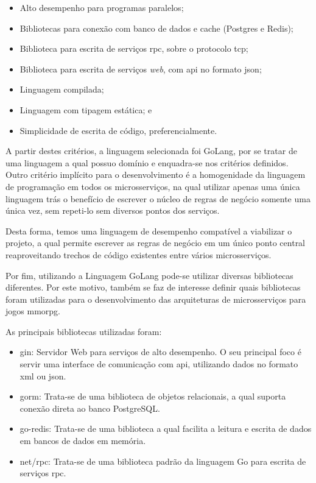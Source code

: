 \begin{itemize}
  \item Alto desempenho para programas paralelos;
  \item Bibliotecas para conexão com banco de dados e cache (Postgres e Redis);
  \item Biblioteca para escrita de serviços \ac{rpc}, sobre o protocolo \ac{tcp};
  \item Biblioteca para escrita de serviços \textit{web}, com \ac{api} no formato \ac{json};
  \item Linguagem compilada;
  \item Linguagem com tipagem estática; e
  \item Simplicidade de escrita de código, preferencialmente.
\end{itemize}



A partir destes critérios, a linguagem selecionada foi GoLang, por se tratar de uma linguagem a qual possuo domínio e enquadra-se nos critérios definidos.
%
Outro critério implícito para o desenvolvimento é a homogenidade da linguagem de programação em todos os microsserviços, na qual utilizar apenas uma única linguagem trás o benefício de escrever o núcleo de regras de negócio somente uma única vez, sem repeti-lo sem diversos pontos dos serviços.



Desta forma, temos uma linguagem de desempenho compatível a viabilizar o projeto, a qual permite escrever as regras de negócio em um único ponto central reaproveitando trechos de código existentes entre vários microsserviços.

Por fim, utilizando a Linguagem GoLang pode-se utilizar diversas bibliotecas diferentes. Por este motivo, também se faz de interesse definir quais bibliotecas foram utilizadas para o desenvolvimento das arquiteturas de microsserviços para jogos \ac{mmorpg}.



As principais bibliotecas utilizadas foram:



\begin{itemize}
  \item gin: Servidor Web para serviços de alto desempenho. O seu principal foco é servir uma interface de comunicação com \ac{api}, utilizando dados no formato \ac{xml} ou \ac{json}.
  \item gorm: Trata-se de uma biblioteca de objetos relacionais, a qual suporta conexão direta ao banco PostgreSQL.
  \item go-redis: Trata-se de uma biblioteca a qual facilita a leitura e escrita de dados em bancos de dados em memória.
  \item net/rpc: Trata-se de uma biblioteca padrão da linguagem Go para escrita de serviços \ac{rpc}.
\end{itemize}



